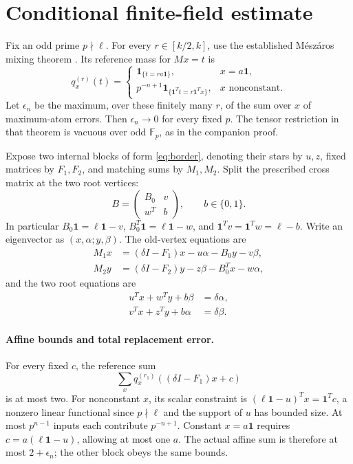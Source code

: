 \documentclass[11pt]{article}
\newcommand{\Fp}{\mathbb F_p}
\newcommand{\one}{\mathbf1}
\begin{document}
\section{Conditional finite-field estimate}
Fix an odd prime $p\nmid\ell$. For every $r\in[k/2,k]$, use the established M\'esz\'aros mixing theorem \cite[Theorem 1.6]{meszaros}. Its reference mass for $Mx=t$ is
\[
 q_x^{(r)}(t)=\begin{cases}
 \boldsymbol1_{\{t=ra\one\}},&x=a\one,\\
 p^{-n+1}\boldsymbol1_{\{\one^Tt=r\one^Tx\}},&x\text{ nonconstant}.
 \end{cases}
\]
Let $\epsilon_n$ be the maximum, over these finitely many $r$, of the sum over $x$ of maximum-atom errors. Then $\epsilon_n\to0$ for every fixed $p$. The tensor restriction in that theorem is vacuous over odd $\Fp$, as in the companion proof.

Expose two internal blocks of form \eqref{eq:border}, denoting their stars by $u,z$, fixed matrices by $F_1,F_2$, and matching sums by $M_1,M_2$. Split the prescribed cross matrix at the two root vertices:
\[
 B=\begin{pmatrix}B_0&v\\w^T&b\end{pmatrix},\qquad b\in\{0,1\}.
\]
In particular $B_0\one=\ell\one-v$, $B_0^T\one=\ell\one-w$, and $\one^Tv=\one^Tw=\ell-b$.
Write an eigenvector as $(x,\alpha;y,\beta)$. The old-vertex equations are
\begin{align*}
 M_1x&=(\delta I-F_1)x-u\alpha-B_0y-v\beta,\\
 M_2y&=(\delta I-F_2)y-z\beta-B_0^Tx-w\alpha,
\end{align*}
and the two root equations are
\begin{align}
 u^Tx+w^Ty+b\beta&=\delta\alpha,\label{eq:r1}\\
 v^Tx+z^Ty+b\alpha&=\delta\beta.\label{eq:r2}
\end{align}

\paragraph{Affine bounds and total replacement error.}
For every fixed $c$, the reference sum
\[
 \sum_xq_x^{(r_1)}((\delta I-F_1)x+c)
\]
is at most two. For nonconstant $x$, its scalar constraint is
$(\ell\one-u)^Tx=\one^Tc$, a nonzero linear functional since $p\nmid\ell$ and the support of $u$ has bounded size. At most $p^{n-1}$ inputs each contribute $p^{-n+1}$. Constant $x=a\one$ requires $c=a(\ell\one-u)$, allowing at most one $a$. The actual affine sum is therefore at most $2+\epsilon_n$; the other block obeys the same bounds.
\end{document}
